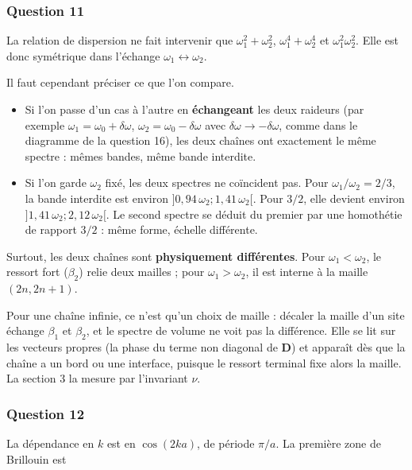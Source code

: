 \documentclass[11pt,a4paper]{article}
\providecommand{\tightlist}{\setlength{\itemsep}{0pt}\setlength{\parskip}{0pt}}
\begin{document}
\hypertarget{question-11}{%
\subsubsection{Question 11}\label{question-11}}

La relation de dispersion ne fait intervenir que \(\omega_1^2+\omega_2^2\), \(\omega_1^4+\omega_2^4\) et \(\omega_1^2\omega_2^2\). Elle est donc symétrique dans l'échange \(\omega_1\leftrightarrow\omega_2\).

Il faut cependant préciser ce que l'on compare.

\begin{itemize}
\tightlist
\item
  Si l'on passe d'un cas à l'autre en \textbf{échangeant} les deux raideurs (par exemple \(\omega_1=\omega_0+\delta\omega\), \(\omega_2=\omega_0-\delta\omega\) avec \(\delta\omega\to-\delta\omega\), comme dans le diagramme de la question 16), les deux chaînes ont exactement le même spectre : mêmes bandes, même bande interdite.
\item
  Si l'on garde \(\omega_2\) fixé, les deux spectres ne coïncident pas. Pour \(\omega_1/\omega_2=2/3\), la bande interdite est environ \(]0{,}94\,\omega_2;1{,}41\,\omega_2[\).
  Pour \(3/2\), elle devient environ \(]1{,}41\,\omega_2;2{,}12\,\omega_2[\).
  Le second spectre se déduit du premier par une homothétie de rapport \(3/2\) : même forme, échelle différente.
\end{itemize}

Surtout, les deux chaînes sont \textbf{physiquement différentes}. Pour \(\omega_1<\omega_2\), le ressort fort (\(\beta_2\)) relie deux mailles ; pour \(\omega_1>\omega_2\), il est interne à la maille \((2n,2n+1)\).

Pour une chaîne infinie, ce n'est qu'un choix de maille : décaler la maille d'un site échange \(\beta_1\) et \(\beta_2\), et le spectre de volume ne voit pas la différence. Elle se lit sur les vecteurs propres (la phase du terme non diagonal de \(\mathbf D\)) et apparaît dès que la chaîne a un bord ou une interface, puisque le ressort terminal fixe alors la maille. La section 3 la mesure par l'invariant \(\nu\).

\hypertarget{question-12}{%
\subsubsection{Question 12}\label{question-12}}

La dépendance en \(k\) est en \(\cos(2ka)\), de période \(\pi/a\). La première zone de Brillouin est
\end{document}
